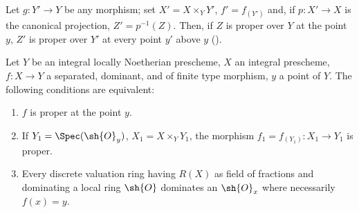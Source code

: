 Let $g:Y'\to Y$ be any morphism; set $X'=X\times_Y Y'$, $f'=f_{(Y')}$ and, if $p:X'\to X$ is the canonical projection, $Z'=p^{-1}(Z)$.
Then, if $Z$ is proper over $Y$ at the point $y$, $Z'$ is proper over $Y'$ at every point $y'$ above $y$ ().

\begin{proposition}[15.7.2]
\label{IV.15.7.2}
Let $Y$ be an integral locally Noetherian prescheme, $X$ an integral prescheme, $f:X\to Y$ a separated, dominant, and of finite type morphism, $y$ a point of $Y$.
The following conditions are equivalent:
\begin{enumerate}[label=\emph{\alph*)}]
  \item $f$ is proper at the point $y$.
  \item If $Y_1=\Spec(\sh{O}_y)$, $X_1=X\times_Y Y_1$, the morphism $f_1=f_{(Y_1)}:X_1\to Y_1$ is proper.
  \item Every discrete valuation ring having $R(X)$ as field of fractions and dominating a local ring $\sh{O}$ dominates an $\sh{O}_x$ where necessarily $f(x)=y$.
\end{enumerate}
\end{proposition}

